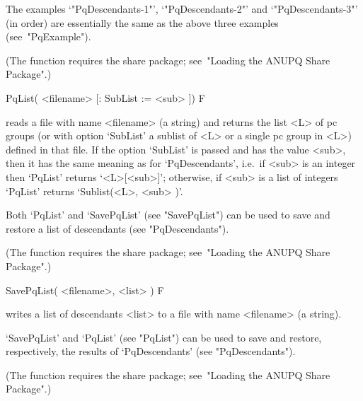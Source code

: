 The     examples     `"PqDescendants-1"',     `"PqDescendants-2"'     and
`"PqDescendants-3"' (in order) are essentially  the  same  as  the  above
three examples (see~"PqExample").

(The function requires the {\ANUPQ} share package; see~"Loading the ANUPQ
Share Package".)

\>PqList( <filename> [: SubList := <sub> ]) F

reads a file with name <filename> (a string) and returns the list <L>  of
pc groups (or with option `SubList' a sublist of <L> or a single pc group
in <L>) defined in that file. If the option `SubList' is passed  and  has
the value <sub>, then it has the same  meaning  as  for  `PqDescendants',
i.e.~if  <sub>  is  an  integer  then  `PqList'   returns   `<L>[<sub>]';
otherwise, if <sub> is a list of integers `PqList' returns  `Sublist(<L>,
<sub> )'.

Both `PqList' and `SavePqList' (see "SavePqList") can be used to save and
restore a list of descendants (see "PqDescendants").

(The function requires the {\ANUPQ} share package; see~"Loading the ANUPQ
Share Package".)

\>SavePqList( <filename>, <list> ) F

writes a list of descendants <list> to a file  with  name  <filename>  (a
string).

`SavePqList' and `PqList' (see "PqList") can be used to save and restore,
respectively, the results of `PqDescendants' (see "PqDescendants").

(The function requires the {\ANUPQ} share package; see~"Loading the ANUPQ
Share Package".)

